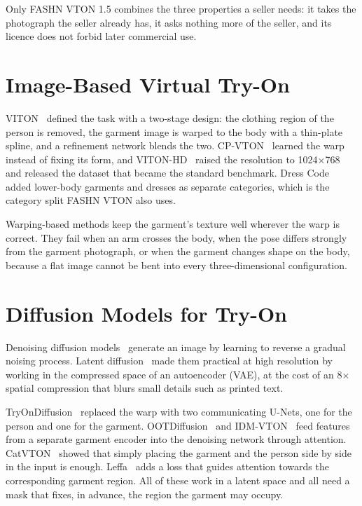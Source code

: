 \noindent Only FASHN VTON 1.5 combines the three properties a seller needs: it takes the photograph the seller already has, it asks nothing more of the seller, and its licence does not forbid later commercial use.

\section{Image-Based Virtual Try-On}

VITON~\cite{viton} defined the task with a two-stage design: the clothing region of the person is removed, the garment image is warped to the body with a thin-plate spline, and a refinement network blends the two. CP-VTON~\cite{cpvton} learned the warp instead of fixing its form, and VITON-HD~\cite{vitonhd} raised the resolution to 1024$\times$768 and released the dataset that became the standard benchmark. Dress Code~\cite{dresscode} added lower-body garments and dresses as separate categories, which is the category split FASHN VTON also uses.

Warping-based methods keep the garment's texture well wherever the warp is correct. They fail when an arm crosses the body, when the pose differs strongly from the garment photograph, or when the garment changes shape on the body, because a flat image cannot be bent into every three-dimensional configuration.

\section{Diffusion Models for Try-On}

Denoising diffusion models~\cite{ddpm} generate an image by learning to reverse a gradual noising process. Latent diffusion~\cite{ldm} made them practical at high resolution by working in the compressed space of an autoencoder (VAE), at the cost of an 8$\times$ spatial compression that blurs small details such as printed text.

TryOnDiffusion~\cite{tryondiff} replaced the warp with two communicating U-Nets, one for the person and one for the garment. OOTDiffusion~\cite{ootd} and IDM-VTON~\cite{idmvton} feed features from a separate garment encoder into the denoising network through attention. CatVTON~\cite{catvton} showed that simply placing the garment and the person side by side in the input is enough. Leffa~\cite{leffa} adds a loss that guides attention towards the corresponding garment region. All of these work in a latent space and all need a mask that fixes, in advance, the region the garment may occupy.

